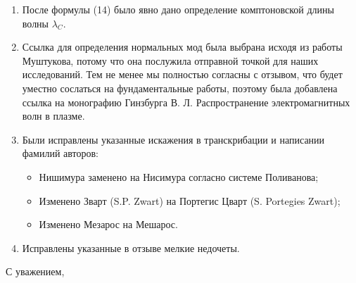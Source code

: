 \documentclass[14pt, russian]{article}
\begin{document}
\begin{enumerate}
	\item После формулы (14) было явно дано определение комптоновской длины волны $\lambda_C$.
	\item Ссылка для определения нормальных мод была выбрана исходя из работы Муштукова, потому что она послужила отправной точкой для наших исследований. Тем не менее мы полностью согласны с отзывом, что будет уместно сослаться на фундаментальные работы, поэтому была добавлена ссылка на монографию Гинзбурга В. Л. Распространение электромагнитных волн в плазме.
	\newpage
	\item Были исправлены указанные искажения в транскрибации и написании фамилий авторов: 
			\begin{itemize}
				\item Нишимура заменено на Нисимура согласно системе Поливанова;
				\item Изменено Зварт (S.P. Zwart) на Портегис Цварт (S. Portegies Zwart);
				\item Изменено Мезарос на Мешарос.
			\end{itemize}
	\item Исправлены указанные в отзыве мелкие недочеты.
	
\end{enumerate} 

\vspace{5mm}
С уважением,
\end{document}
